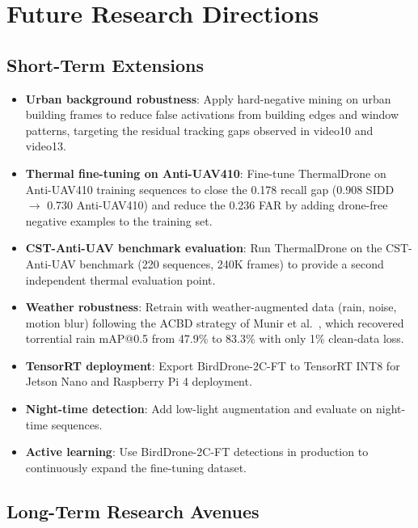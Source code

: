 \documentclass[12pt,a4paper]{report}
\begin{document}
\section{Future Research Directions}

\subsection{Short-Term Extensions}

\begin{itemize}
  \item \textbf{Urban background robustness}: Apply hard-negative mining
        on urban building frames to reduce false activations from building
        edges and window patterns, targeting the residual tracking gaps
        observed in video10 and video13.
  \item \textbf{Thermal fine-tuning on Anti-UAV410}: Fine-tune ThermalDrone
        on Anti-UAV410 training sequences to close the 0.178 recall gap
        (0.908 SIDD $\to$ 0.730 Anti-UAV410) and reduce the 0.236 FAR
        by adding drone-free negative examples to the training set.
  \item \textbf{CST-Anti-UAV benchmark evaluation}: Run ThermalDrone on
        the CST-Anti-UAV benchmark (220 sequences, 240K frames) to provide
        a second independent thermal evaluation point.
  \item \textbf{Weather robustness}: Retrain with weather-augmented data
        (rain, noise, motion blur) following the ACBD strategy of
        Munir et al.~\cite{munir2023kfupm}, which recovered torrential
        rain mAP@0.5 from 47.9\% to 83.3\% with only 1\% clean-data loss.
  \item \textbf{TensorRT deployment}: Export BirdDrone-2C-FT to TensorRT
        INT8 for Jetson Nano and Raspberry Pi 4 deployment.
  \item \textbf{Night-time detection}: Add low-light augmentation and
        evaluate on night-time sequences.
  \item \textbf{Active learning}: Use BirdDrone-2C-FT detections in
        production to continuously expand the fine-tuning dataset.
\end{itemize}

\subsection{Long-Term Research Avenues}
\end{document}

